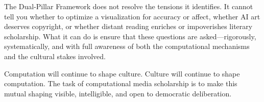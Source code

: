 \documentclass[11pt,a4paper]{article}
\begin{document}
The Dual-Pillar Framework does not resolve the tensions it identifies. It cannot tell you whether to optimize a visualization for accuracy or affect, whether AI art deserves copyright, or whether distant reading enriches or impoverishes literary scholarship. What it can do is ensure that these questions are asked---rigorously, systematically, and with full awareness of both the computational mechanisms and the cultural stakes involved.

Computation will continue to shape culture. Culture will continue to shape computation. The task of computational media scholarship is to make this mutual shaping visible, intelligible, and open to democratic deliberation.


\end{document}

